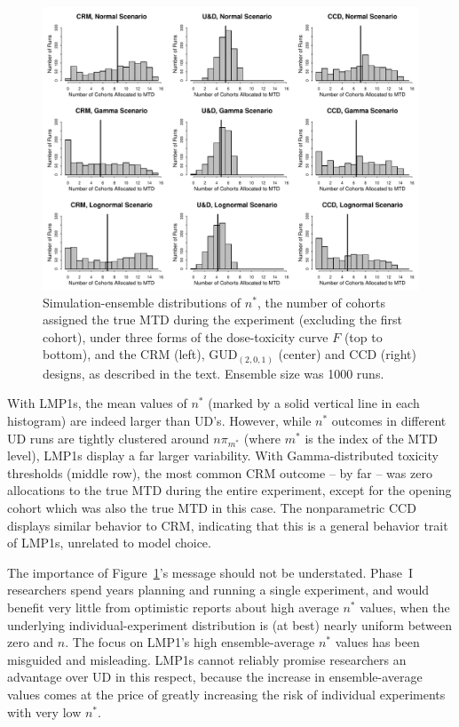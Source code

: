 \begin{figure}[!ht]
\begin{center}
\includegraphics[scale=0.73]{nstar}
\end{center}
\caption{Simulation-ensemble distributions of $n^*$, the number of cohorts assigned the true MTD during the experiment  (excluding the first cohort), under three forms of the dose-toxicity curve $F$ (top to bottom), and the CRM (left),  GUD$_{(2,0,1)}$ (center) and CCD (right) designs, as described in the text. Ensemble size was 1000 runs.}\label{fig:nstar}
\end{figure}

With LMP1s, the mean values of $n^*$ (marked by a solid vertical line in each histogram) are indeed larger than UD's. However, while $n^*$ outcomes in different UD runs are tightly clustered around $n\pi_{m^*}$ (where $m^*$ is the index of the MTD level), LMP1s display a far larger variability. With Gamma-distributed toxicity thresholds (middle row), the most common CRM outcome -- by far -- was zero allocations to the true MTD during the entire experiment, except for the opening cohort which was also the true MTD in this case. The nonparametric CCD displays similar behavior to CRM, indicating that this is a general behavior trait of LMP1s, unrelated to model choice.

The importance of Figure~\ref{fig:nstar}'s message  should not be understated.  Phase~I researchers spend years planning and running a single experiment, and would benefit very little from optimistic reports about high average $n^*$ values, when the underlying individual-experiment distribution is (at best) nearly uniform between zero and $n$. The focus on LMP1's high ensemble-average $n^*$ values has been misguided and misleading. LMP1s cannot reliably promise researchers an advantage over UD in this respect, because the increase in ensemble-average values comes at the price of greatly increasing the risk of individual experiments with very low $n^*$.

